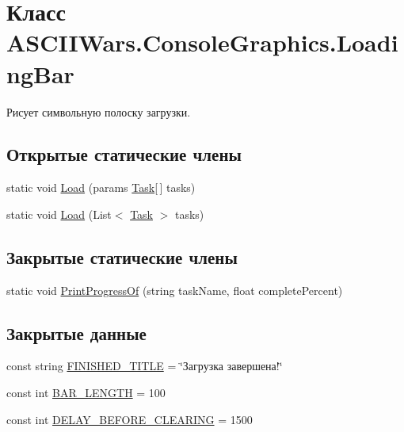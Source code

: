 \hypertarget{class_a_s_c_i_i_wars_1_1_console_graphics_1_1_loading_bar}{}\section{Класс A\+S\+C\+I\+I\+Wars.\+Console\+Graphics.\+Loading\+Bar}
\label{class_a_s_c_i_i_wars_1_1_console_graphics_1_1_loading_bar}


Рисует символьную полоску загрузки.  


\subsection*{Открытые статические члены}
\begin{DoxyCompactItemize}
\item 
static void \hyperlink{class_a_s_c_i_i_wars_1_1_console_graphics_1_1_loading_bar_a573cfd9dc72c4277e97c5fe2f358c3dd}{Load} (params \hyperlink{class_a_s_c_i_i_wars_1_1_console_graphics_1_1_task}{Task}\mbox{[}$\,$\mbox{]} tasks)
\item 
static void \hyperlink{class_a_s_c_i_i_wars_1_1_console_graphics_1_1_loading_bar_a45b8be22b39aee7e47e9d6669670dd7d}{Load} (List$<$ \hyperlink{class_a_s_c_i_i_wars_1_1_console_graphics_1_1_task}{Task} $>$ tasks)
\end{DoxyCompactItemize}
\subsection*{Закрытые статические члены}
\begin{DoxyCompactItemize}
\item 
static void \hyperlink{class_a_s_c_i_i_wars_1_1_console_graphics_1_1_loading_bar_aa9838505eb125e0fc4ede3576f59513a}{Print\+Progress\+Of} (string task\+Name, float complete\+Percent)
\end{DoxyCompactItemize}
\subsection*{Закрытые данные}
\begin{DoxyCompactItemize}
\item 
const string \hyperlink{class_a_s_c_i_i_wars_1_1_console_graphics_1_1_loading_bar_aa75543e5166964ca32750bb66591ab3d}{F\+I\+N\+I\+S\+H\+E\+D\+\_\+\+T\+I\+T\+LE} = \char`\"{}Загрузка завершена!\char`\"{}
\item 
const int \hyperlink{class_a_s_c_i_i_wars_1_1_console_graphics_1_1_loading_bar_a0b1318cefcfe584170b1c6089213f251}{B\+A\+R\+\_\+\+L\+E\+N\+G\+TH} = 100
\item 
const int \hyperlink{class_a_s_c_i_i_wars_1_1_console_graphics_1_1_loading_bar_ae05f622988d5cebaa3e0c14d45d832fb}{D\+E\+L\+A\+Y\+\_\+\+B\+E\+F\+O\+R\+E\+\_\+\+C\+L\+E\+A\+R\+I\+NG} = 1500
\end{DoxyCompactItemize}


